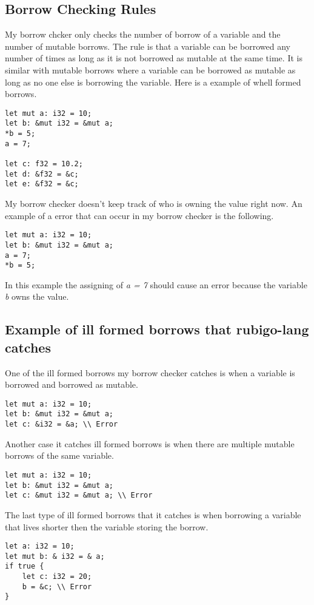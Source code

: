 \documentclass[12pt]{article}
\begin{document}
    	\subsection{Borrow Checking Rules}
 		My borrow chcker only checks the number of borrow of a variable and the number of mutable borrows. The rule is that a variable can be borrowed any number of times as long as it is not borrowed as mutable at the same time. It is similar with mutable borrows where a variable can be borrowed as mutable as long as no one else is borrowing the variable. Here is a example of whell formed borrows.
	\begin{verbatim}
let mut a: i32 = 10;
let b: &mut i32 = &mut a;
*b = 5;
a = 7;

let c: f32 = 10.2;
let d: &f32 = &c;
let e: &f32 = &c;
    	\end{verbatim}

		My borrow checker doesn't keep track of who is owning the value right now. An example of a error that can occur in my borrow checker is the following.

	\begin{verbatim}
let mut a: i32 = 10;
let b: &mut i32 = &mut a;
a = 7;
*b = 5;
    	\end{verbatim}

	In this example the assigning of \emph{a = 7} should cause an error because the variable \emph{b} owns the value.



	\subsection{Example of ill formed borrows that rubigo-lang catches}
		One of the ill formed borrows my borrow checker catches is when a variable is borrowed and borrowed as mutable.
	\begin{verbatim}
let mut a: i32 = 10;
let b: &mut i32 = &mut a;
let c: &i32 = &a; \\ Error
    	\end{verbatim}

	Another case it catches ill formed borrows is when there are multiple mutable borrows of the same variable.
	\begin{verbatim}
let mut a: i32 = 10;
let b: &mut i32 = &mut a;
let c: &mut i32 = &mut a; \\ Error
    	\end{verbatim}

	The last type of ill formed borrows that it catches is when borrowing a variable that lives shorter then the variable storing the borrow.
	\begin{verbatim}
let a: i32 = 10;
let mut b: & i32 = & a;
if true {
    let c: i32 = 20;
    b = &c; \\ Error
}
    	\end{verbatim}
\end{document}

